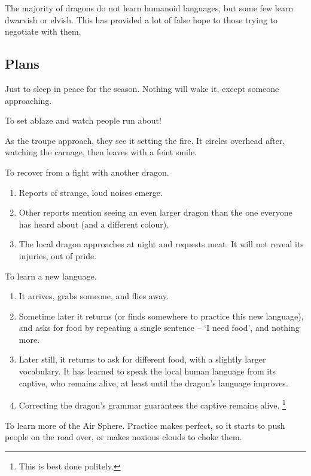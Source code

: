 \begin{multicols}{2}
The majority of dragons do not learn humanoid languages, but some few learn dwarvish or elvish.
This has provided a lot of false hope to those trying to negotiate with them.

\dragon

\showStdSpells

\subsection{Plans}

\begin{dlist}
  \item
  Just to sleep in peace for the season.
  Nothing will wake it, except someone approaching.
  \item
  To set  ablaze and watch people run about!

  As the troupe approach, they see it setting the fire.
  It circles overhead after, watching the carnage, then leaves with a feint smile.
  \item
  To recover from a fight with another dragon.
  \begin{enumerate}
    \item
    Reports of strange, loud noises emerge.
    \item
    Other reports mention seeing an even larger dragon than the one everyone has heard about (and a different colour).
    \item
    The local dragon approaches  at night and requests meat.
    It will not reveal its injuries, out of pride.
  \end{enumerate}
  \item
  To learn a new language.
  \begin{enumerate}
    \item
    It arrives, grabs someone, and flies away.
    \item
    Sometime later it returns (or finds somewhere to practice this new language), and asks for food by repeating a single sentence -- `I need food', and nothing more.
    \item
    Later still, it returns to ask for different food, with a slightly larger vocabulary.
    It has learned to speak the local human language from its captive, who remains alive, at least until the dragon's language improves.
    \item
    Correcting the dragon's grammar guarantees the captive remains alive.%
    \footnote{This is best done politely.}
  \end{enumerate}
  \item
  To learn more of the Air Sphere.
  Practice makes perfect, so it starts to push people on the road over, or makes noxious clouds to choke them.


\end{dlist}
\end{multicols}
